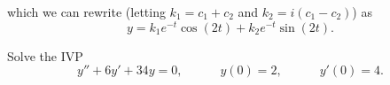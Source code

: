 \begin{applicationActivities}
\begin{observation}
which we can rewrite (letting \(k_1=c_1+c_2\) and \(k_2=i(c_1-c_2)\)) as
\[y=k_1 e^{-t} \cos(2t) + k_2 e^{-t}\sin(2t).\]
\end{observation}

\begin{activity}{15}
Solve the IVP
\[y''+6y'+34y=0, \hspace{3em} y(0)=2, \hspace{3em} y'(0)=4.\]
\end{activity}


\end{applicationActivities}
